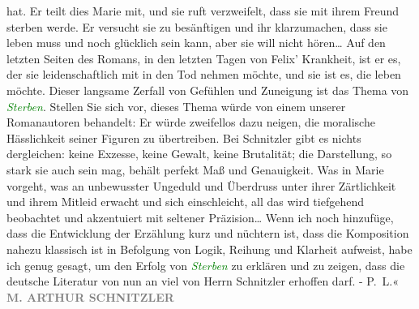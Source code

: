 {{{{{                                 hat. Er teilt dies Marie mit, und sie ruft verzweifelt, dass sie
                                 mit ihrem Freund sterben werde. Er versucht sie zu besänftigen und
                                 ihr klarzumachen, dass sie leben muss und noch glücklich sein kann,
                                 aber sie will nicht hören{\dots} Auf den
                                 letzten Seiten des Romans, in den letzten Tagen von Felix’
                                 Krankheit, ist er es, der sie leidenschaftlich mit in den Tod
                                 nehmen möchte, und sie ist es, die leben möchte. Dieser langsame
                                 Zerfall von Gefühlen und Zuneigung ist das Thema von \textcolor{green}{\emph{Sterben}}. Stellen Sie sich vor, dieses Thema würde von einem unserer
                                 Romanautoren behandelt: Er würde zweifellos dazu neigen, die
                                 moralische Hässlichkeit seiner Figuren zu übertreiben. Bei
                                 Schnitzler gibt es nichts dergleichen: keine Exzesse, keine Gewalt,
                                 keine Brutalität; die Darstellung, so stark sie auch sein mag,
                                 behält perfekt Maß und Genauigkeit. Was in Marie vorgeht, was an
                                 unbewusster Ungeduld und Überdruss unter ihrer Zärtlichkeit und
                                 ihrem Mitleid erwacht und sich einschleicht, all das wird
                                 tiefgehend beobachtet und akzentuiert mit seltener Präzision{\dots} Wenn ich noch hinzufüge, dass die
                                 Entwicklung der Erzählung kurz und nüchtern ist, dass die
                                 Komposition nahezu klassisch ist in Befolgung von Logik, Reihung
                                 und Klarheit aufweist, habe ich genug gesagt, um den Erfolg von \textcolor{green}{\emph{Sterben}} zu erklären und zu zeigen, dass die deutsche Literatur von
                                 nun an viel von Herrn Schnitzler erhoffen darf. -
                              P. L.«}}}\label{K_L02731-11h}}}\pend
           \pstart
           \noindent{}\centering{}\textcolor{gray}{\textbf{M. ARTHUR SCHNITZLER}}\pend
           \pstart
